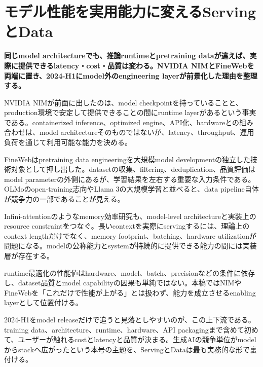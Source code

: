 \section{モデル性能を実用能力に変えるServingとData}
\label{pkg:systems-data}
\noindent\textbf{同じmodel architectureでも、推論runtimeとpretraining dataが違えば、実際に提供できるlatency・cost・品質は変わる。NVIDIA NIMとFineWebを両端に置き、2024-H1にmodel外のengineering layerが前景化した理由を整理する。}\autocite{src-054d1f81750b,src-51631a225b70}

NVIDIA NIMが前面に出したのは、model checkpointを持っていることと、production環境で安定して提供できることの間にruntime layerがあるという事実である。containerized inference、optimized engine、API化、hardwareとの組み合わせは、model architectureそのものではないが、latency、throughput、運用負荷を通じて利用可能な能力を決める。\autocite{src-054d1f81750b}


FineWebはpretraining data engineeringを大規模model developmentの独立した技術対象として押し出した。datasetの収集、filtering、deduplication、品質評価はmodel parameterの外側にあるが、学習結果を左右する重要な入力条件である。OLMoのopen-training志向やLlama 3の大規模学習と並べると、data pipeline自体が競争力の一部であることが見える。\autocite{src-3d2fa83e273d,src-51631a225b70,src-f9616f30e8f5}


Infini-attentionのようなmemory効率研究も、model-level architectureと実装上のresource constraintをつなぐ。長いcontextを実際にservingするには、理論上のcontext lengthだけでなく、memory footprint、batching、hardware utilizationが問題になる。modelの公称能力とsystemが持続的に提供できる能力の間には実装層が存在する。\autocite{src-054d1f81750b,src-2eb2353f0533}


\begin{claimboundary}
runtime最適化の性能値はhardware、model、batch、precisionなどの条件に依存し、dataset品質とmodel capabilityの因果も単純ではない。本稿ではNIMやFineWebを「これだけで性能が上がる」とは扱わず、能力を成立させるenabling layerとして位置付ける。\autocite{src-054d1f81750b,src-51631a225b70}
\end{claimboundary}

2024-H1をmodel releaseだけで追うと見落としやすいのが、この上下流である。training data、architecture、runtime、hardware、API packagingまで含めて初めて、ユーザーが触れるcostとlatencyと品質が決まる。生成AIの競争単位がmodelからstackへ広がったという本号の主題を、ServingとDataは最も実務的な形で裏付ける。\autocite{src-054d1f81750b,src-2eb2353f0533,src-3d2fa83e273d,src-51631a225b70,src-f9616f30e8f5}
